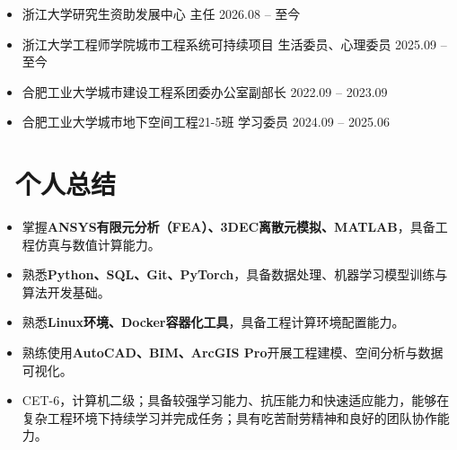 \documentclass[11pt]{article}
\begin{document}
\begin{itemize}
\item 浙江大学研究生资助发展中心 主任 \hfill 2026.08 -- 至今
\item 浙江大学工程师学院城市工程系统可持续项目 生活委员、心理委员 \hfill 2025.09 -- 至今
\item 合肥工业大学城市建设工程系团委办公室副部长 \hfill 2022.09 -- 2023.09
\item 合肥工业大学城市地下空间工程21-5班 学习委员 \hfill 2024.09 -- 2025.06
\end{itemize}

\section{\makebox[\widthof{\faCogs}][c]{\color{CVBlue}\faCogs}\ 个人总结}

\begin{itemize}
\item 掌握\textbf{ANSYS有限元分析（FEA）、3DEC离散元模拟、MATLAB}，具备工程仿真与数值计算能力。
\item 熟悉\textbf{Python、SQL、Git、PyTorch}，具备数据处理、机器学习模型训练与算法开发基础。
\item 熟悉\textbf{Linux环境、Docker容器化工具}，具备工程计算环境配置能力。
\item 熟练使用\textbf{AutoCAD、BIM、ArcGIS Pro}开展工程建模、空间分析与数据可视化。
\item CET-6，计算机二级；具备较强学习能力、抗压能力和快速适应能力，能够在复杂工程环境下持续学习并完成任务；具有吃苦耐劳精神和良好的团队协作能力。
\end{itemize}
\end{document}

